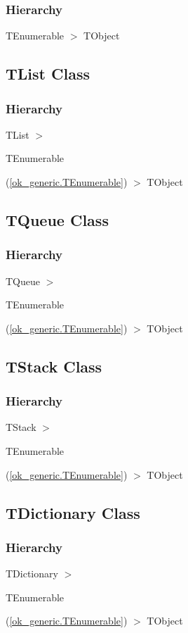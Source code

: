 \documentclass{report}
\begin{document}
\subsubsection*{\large{\textbf{Hierarchy}}\normalsize\hspace{1ex}\hfill}
TEnumerable {$>$} TObject
\subsection*{TList Class}
\subsubsection*{\large{\textbf{Hierarchy}}\normalsize\hspace{1ex}\hfill}
TList {$>$} \begin{ttfamily}TEnumerable\end{ttfamily}(\ref{ok_generic.TEnumerable}) {$>$} 
TObject
\subsection*{TQueue Class}
\subsubsection*{\large{\textbf{Hierarchy}}\normalsize\hspace{1ex}\hfill}
TQueue {$>$} \begin{ttfamily}TEnumerable\end{ttfamily}(\ref{ok_generic.TEnumerable}) {$>$} 
TObject
\subsection*{TStack Class}
\subsubsection*{\large{\textbf{Hierarchy}}\normalsize\hspace{1ex}\hfill}
TStack {$>$} \begin{ttfamily}TEnumerable\end{ttfamily}(\ref{ok_generic.TEnumerable}) {$>$} 
TObject
\subsection*{TDictionary Class}
\subsubsection*{\large{\textbf{Hierarchy}}\normalsize\hspace{1ex}\hfill}
TDictionary {$>$} \begin{ttfamily}TEnumerable\end{ttfamily}(\ref{ok_generic.TEnumerable}) {$>$} 
TObject
\end{document}

